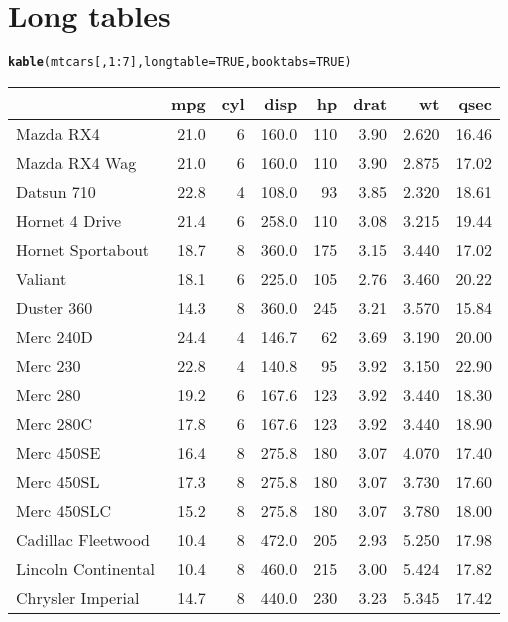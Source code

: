 \documentclass{article}\usepackage[]{graphicx}\usepackage[]{color}
\makeatletter
\newcommand{\hlnum}[1]{\textcolor[rgb]{0.686,0.059,0.569}{#1}}%
\newcommand{\hlopt}[1]{\textcolor[rgb]{0,0,0}{#1}}%
\newcommand{\hlstd}[1]{\textcolor[rgb]{0.345,0.345,0.345}{#1}}%
\newcommand{\hlkwc}[1]{\textcolor[rgb]{0.333,0.667,0.333}{#1}}%
\newcommand{\hlkwd}[1]{\textcolor[rgb]{0.737,0.353,0.396}{\textbf{#1}}}%
\newenvironment{kframe}{%
 \def\at@end@of@kframe{}%
 \ifinner\ifhmode%
  \def\at@end@of@kframe{\end{minipage}}%
  \begin{minipage}{\columnwidth}%
 \fi\fi%
 \def\FrameCommand##1{\hskip\@totalleftmargin \hskip-\fboxsep
 \colorbox{shadecolor}{##1}\hskip-\fboxsep
     \hskip-\linewidth \hskip-\@totalleftmargin \hskip\columnwidth}%
 \MakeFramed {\advance\hsize-\width
   \@totalleftmargin\z@ \linewidth\hsize
   \@setminipage}}%
 {\par\unskip\endMakeFramed%
 \at@end@of@kframe}
\makeatother
\begin{document}
\section{Long tables}

\begin{kframe}
\begin{alltt}
\hlkwd{kable}\hlstd{(mtcars[,} \hlnum{1}\hlopt{:}\hlnum{7}\hlstd{],} \hlkwc{longtable} \hlstd{=} \hlnum{TRUE}\hlstd{,} \hlkwc{booktabs} \hlstd{=} \hlnum{TRUE}\hlstd{)}
\end{alltt}
\end{kframe}\begin{longtable}{lrrrrrrr}
\toprule
  & mpg & cyl & disp & hp & drat & wt & qsec\\
\midrule
Mazda RX4 & 21.0 & 6 & 160.0 & 110 & 3.90 & 2.620 & 16.46\\
\midrule
Mazda RX4 Wag & 21.0 & 6 & 160.0 & 110 & 3.90 & 2.875 & 17.02\\
\midrule
Datsun 710 & 22.8 & 4 & 108.0 &  93 & 3.85 & 2.320 & 18.61\\
\midrule
Hornet 4 Drive & 21.4 & 6 & 258.0 & 110 & 3.08 & 3.215 & 19.44\\
\midrule
Hornet Sportabout & 18.7 & 8 & 360.0 & 175 & 3.15 & 3.440 & 17.02\\
\midrule
Valiant & 18.1 & 6 & 225.0 & 105 & 2.76 & 3.460 & 20.22\\
\midrule
Duster 360 & 14.3 & 8 & 360.0 & 245 & 3.21 & 3.570 & 15.84\\
\midrule
Merc 240D & 24.4 & 4 & 146.7 &  62 & 3.69 & 3.190 & 20.00\\
\midrule
Merc 230 & 22.8 & 4 & 140.8 &  95 & 3.92 & 3.150 & 22.90\\
\midrule
Merc 280 & 19.2 & 6 & 167.6 & 123 & 3.92 & 3.440 & 18.30\\
\midrule
Merc 280C & 17.8 & 6 & 167.6 & 123 & 3.92 & 3.440 & 18.90\\
\midrule
Merc 450SE & 16.4 & 8 & 275.8 & 180 & 3.07 & 4.070 & 17.40\\
\midrule
Merc 450SL & 17.3 & 8 & 275.8 & 180 & 3.07 & 3.730 & 17.60\\
\midrule
Merc 450SLC & 15.2 & 8 & 275.8 & 180 & 3.07 & 3.780 & 18.00\\
\midrule
Cadillac Fleetwood & 10.4 & 8 & 472.0 & 205 & 2.93 & 5.250 & 17.98\\
\midrule
Lincoln Continental & 10.4 & 8 & 460.0 & 215 & 3.00 & 5.424 & 17.82\\
\midrule
Chrysler Imperial & 14.7 & 8 & 440.0 & 230 & 3.23 & 5.345 & 17.42\\

\end{longtable}
\end{document}
